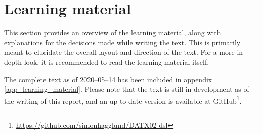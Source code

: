 \section{Learning material}\label{sec:learningmaterial}
\iffalse
 In this section we present a summary and some extracts from the learning material. This is meant to provide the reader with basic familiarity with the learning material to more easily be able to follow the rest of the report. 

All the material from our project is available at GitHub\footnote{ \url{https://github.com/simonhagglund/DATX02-dsl}} where the material itself, all code and this report is accessible. A snapshot of the material as of 2020-06-05 attached in appendix \ref{app_learning_material}. Please note that the material is still in development and an updated version is available on GitHub.

 \fi
 
\begin{modtext}
This section provides an overview of the learning material, along with  explanations for the decisions made while writing the text. This is primarily meant to elucidate the overall layout and direction of the text. For a more in-depth look, it is recommended to read the learning material itself.

The complete text as of 2020--05--14 has been included in appendix \ref{app_learning_material}. Please note that the text is still in development as of the writing of this report, and an up-to-date version is available at GitHub\footnote{\url{https://github.com/simonhagglund/DATX02-dsl}}.
\end{modtext}




